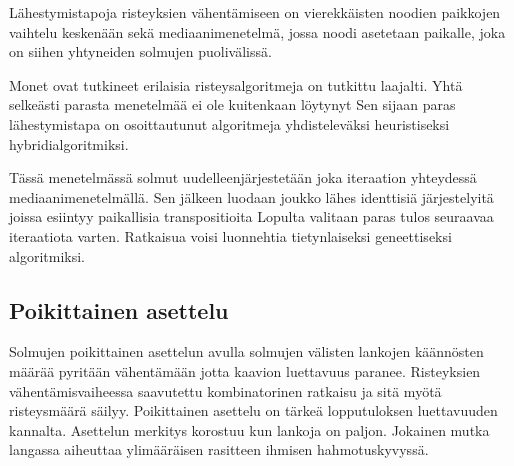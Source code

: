 \documentclass[finnish,12pt]{article}
\begin{document}
Lähestymistapoja risteyksien vähentämiseen on vierekkäisten noodien paikkojen
vaihtelu keskenään sekä mediaanimenetelmä, jossa noodi asetetaan paikalle, joka
on siihen yhtyneiden solmujen puolivälissä.

Monet ovat tutkineet erilaisia risteysalgoritmeja on tutkittu laajalti.
Yhtä selkeästi parasta menetelmää ei ole kuitenkaan löytynyt
Sen sijaan paras lähestymistapa on osoittautunut algoritmeja
yhdisteleväksi heuristiseksi hybridialgoritmiksi.

Tässä menetelmässä solmut uudelleenjärjestetään joka iteraation yhteydessä mediaanimenetelmällä. Sen jälkeen 
luodaan joukko lähes identtisiä järjestelyitä joissa esiintyy paikallisia transpositioita
Lopulta valitaan paras tulos seuraavaa iteraatiota varten.
Ratkaisua voisi luonnehtia tietynlaiseksi geneettiseksi algoritmiksi.


		\subsection{Poikittainen asettelu}

Solmujen poikittainen asettelun avulla solmujen välisten lankojen käännösten
määrää pyritään vähentämään jotta kaavion luettavuus paranee.
Risteyksien vähentämisvaiheessa saavutettu kombinatorinen ratkaisu ja sitä myötä
risteysmäärä säilyy.
Poikittainen asettelu on tärkeä lopputuloksen luettavuuden kannalta. Asettelun merkitys korostuu kun lankoja on paljon.
Jokainen mutka langassa aiheuttaa ylimääräisen rasitteen ihmisen hahmotuskyvyssä.

\clearpage
{} %
 
\end{document}
